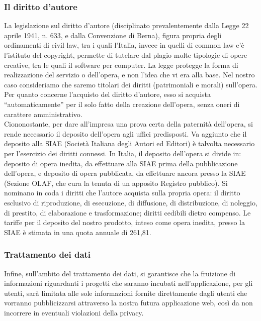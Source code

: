 \subsubsection{Il diritto d'autore}
La legislazione sul diritto d'autore (disciplinato prevalentemente dalla Legge 22 aprile 1941, n. 633, e dalla Convenzione di Berna), figura propria degli ordinamenti di civil law, tra i quali l'Italia, invece in quelli di common law c'è l'istituto del copyright, permette di tutelare dal plagio molte tipologie di opere creative, tra le quali il software per computer. La legge protegge la forma di realizzazione del servizio o dell'opera, e non l'idea che vi era alla base. Nel nostro caso consideriamo che saremo titolari dei diritti (patrimoniali e morali) sull'opera. Per quanto concerne l'acquisto del diritto d'autore, esso si acquista ``automaticamente'' per il solo fatto della creazione dell'opera, senza oneri di carattere amministrativo.\\
Ciononostante, per dare all'impresa una prova certa della paternità dell'opera, si rende necessario il deposito dell'opera agli uffici predisposti. Va aggiunto che il deposito alla SIAE (Società Italiana degli Autori ed Editori) è talvolta necessario per l'esercizio dei diritti connessi. In Italia, il deposito dell'opera si divide in: deposito di opera inedita, da effettuare alla SIAE prima della pubblicazione dell'opera, e deposito di opera pubblicata, da effettuare ancora presso la SIAE (Sezione OLAF, che cura la tenuta di un apposito Registro pubblico). Si nominano in coda i diritti che l'autore acquista sulla propria opera: il diritto esclusivo di riproduzione, di esecuzione, di diffusione, di distribuzione, di noleggio, di prestito, di elaborazione e trasformazione; diritti cedibili dietro compenso. Le tariffe per il deposito del nostro prodotto, inteso come opera inedita, presso la SIAE è stimata in una quota annuale di 261,81\officialeuro.

\subsubsection{Trattamento dei dati}
Infine, sull'ambito del trattamento dei dati, si garantisce che la fruizione di informazioni riguardanti i progetti che saranno incubati nell'applicazione, per gli utenti, sarà limitata alle sole informazioni fornite direttamente dagli utenti che vorranno pubblicizzarsi attraverso la nostra futura applicazione web, così da non incorrere in eventuali violazioni della privacy.